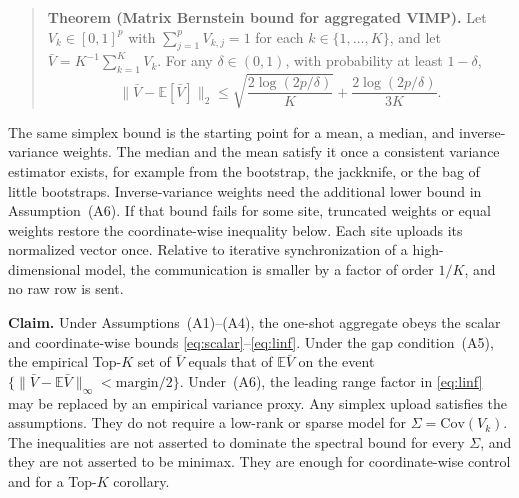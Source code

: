 \begin{quote}
\noindent\textbf{Theorem (Matrix Bernstein bound for aggregated VIMP).}
Let \(V_k\in[0,1]^p\) with \(\sum_{j=1}^p V_{k,j}=1\) for each
\(k\in\{1,\ldots,K\}\), and let
\(\bar V=K^{-1}\sum_{k=1}^K V_k\).
For any \(\delta\in(0,1)\), with probability at least \(1-\delta\),
\begin{equation}
\label{eq:matrix_bernstein_main}
\bigl\| \bar V - \mathbb{E}[\bar V] \bigr\|_2
\le
\sqrt{\frac{2\log(2p/\delta)}{K}}
+
\frac{2\log(2p/\delta)}{3K}.
\end{equation}
\end{quote}

The same simplex bound is the starting point for a mean, a median, and
inverse-variance weights.
The median and the mean satisfy it once a consistent variance estimator
exists, for example from the bootstrap, the jackknife, or the
bag of little bootstraps.
Inverse-variance weights need the additional lower bound in
Assumption~(A6).
If that bound fails for some site, truncated weights or equal weights
restore the coordinate-wise inequality below.
Each site uploads its normalized vector once.
Relative to iterative synchronization of a high-dimensional model, the
communication is smaller by a factor of order \(1/K\), and no raw row is
sent.

\par\noindent\textbf{Claim.}
\label{sec:fed-ood-vimp-tight}
Under Assumptions~(A1)--(A4), the one-shot aggregate obeys the scalar and
coordinate-wise bounds \eqref{eq:scalar}--\eqref{eq:linf}.
Under the gap condition~(A5), the empirical Top-\(K\) set of \(\bar V\)
equals that of \(\mathbb{E}\bar V\) on the event
\(\{\|\bar V-\mathbb{E}\bar V\|_{\infty}<\mathrm{margin}/2\}\).
Under~(A6), the leading range factor in \eqref{eq:linf} may be replaced
by an empirical variance proxy.
Any simplex upload satisfies the assumptions.
They do not require a low-rank or sparse model for
\(\Sigma=\mathrm{Cov}(V_k)\).
The inequalities are not asserted to dominate the spectral bound for every
\(\Sigma\), and they are not asserted to be minimax.
They are enough for coordinate-wise control and for a Top-\(K\) corollary.


